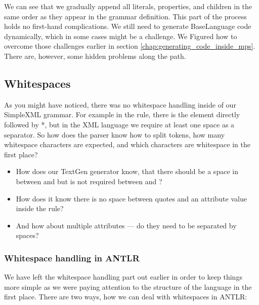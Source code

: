 We can see that we gradually append all literals, properties, and children in the same order as they appear in the grammar definition.
This part of the process holds no first-hand complications.
We still need to generate BaseLanguage code dynamically, which in some cases might be a challenge.
We Figured how to overcome those challenges earlier in section \ref{chap:generating_code_inside_mps}.
There are, however, some hidden problems along the path.

\subsection{Whitespaces}
\label{chap:whitespaces}

As you might have noticed, there was no whitespace handling inside of our SimpleXML grammar.
For example in the  rule, there is  the element directly followed by *, but in the XML language we require at least one space as a separator.
So how does the parser know how to split tokens, how many whitespace characters are expected, and which characters are whitespace in the first place?

\begin{itemize}
	\item How does our TextGen generator know, that there should be a space in between  and  but is not required between \literal{\textless} and ?

	\item How does it know there is no space between quotes and an attribute value inside the  rule?

	\item And how about multiple attributes --- do they need to be separated by spaces?
\end{itemize}

\subsubsection{Whitespace handling in ANTLR}

We have left the whitespace handling part out earlier in order to keep things more simple as we were paying attention to the structure of the language in the first place.
There are two ways, how we can deal with whitespaces in ANTLR:

